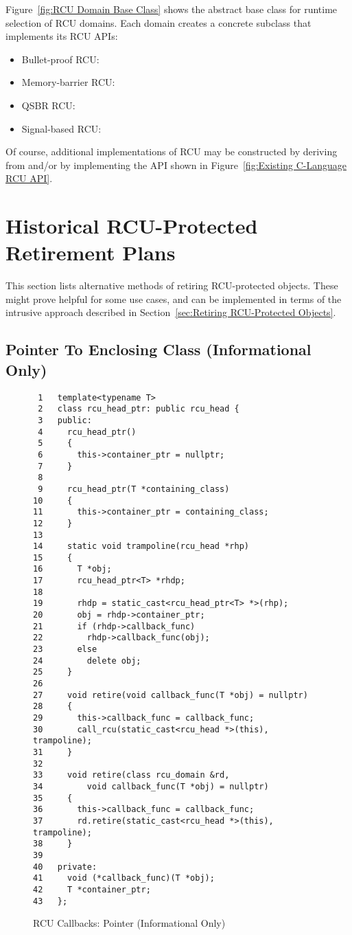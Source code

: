 \documentclass[letterpaper,10pt]{article}
\begin{document}
Figure~\ref{fig:RCU Domain Base Class}
shows the abstract base class for runtime selection of RCU domains.
Each domain creates a concrete subclass that implements its RCU APIs:

\begin{itemize}
\item	Bullet-proof RCU: 
\item	Memory-barrier RCU: 
\item	QSBR RCU: 
\item	Signal-based RCU: 
\end{itemize}

Of course, additional implementations of RCU may be constructed by
deriving from  and/or by implementing the API
shown in
Figure~\ref{fig:Existing C-Language RCU API}.

\section{Historical RCU-Protected Retirement Plans}
\label{fig:Historical RCU-Protected Retirement Plans}

This section lists alternative methods of retiring RCU-protected
objects.
These might prove helpful for some use cases, and can be implemented
in terms of the intrusive approach described in
Section~\ref{sec:Retiring RCU-Protected Objects}.

\subsection{Pointer To Enclosing Class (Informational Only)}
\label{sec:Pointer To Enclosing Class}

\begin{figure}[tbp]
{ \scriptsize
\begin{verbatim}
 1   template<typename T>
 2   class rcu_head_ptr: public rcu_head {
 3   public:
 4     rcu_head_ptr()
 5     {
 6       this->container_ptr = nullptr;
 7     }
 8
 9     rcu_head_ptr(T *containing_class)
10     {
11       this->container_ptr = containing_class;
12     }
13
14     static void trampoline(rcu_head *rhp)
15     {
16       T *obj;
17       rcu_head_ptr<T> *rhdp;
18
19       rhdp = static_cast<rcu_head_ptr<T> *>(rhp);
20       obj = rhdp->container_ptr;
21       if (rhdp->callback_func)
22         rhdp->callback_func(obj);
23       else
24         delete obj;
25     }
26
27     void retire(void callback_func(T *obj) = nullptr)
28     {
29       this->callback_func = callback_func;
30       call_rcu(static_cast<rcu_head *>(this), trampoline);
31     }
32
33     void retire(class rcu_domain &rd,
34         void callback_func(T *obj) = nullptr)
35     {
36       this->callback_func = callback_func;
37       rd.retire(static_cast<rcu_head *>(this), trampoline);
38     }
39
40   private:
41     void (*callback_func)(T *obj);
42     T *container_ptr;
43   };
\end{verbatim}
}
\caption{RCU Callbacks: Pointer (Informational Only)}
\label{fig:RCU Callbacks: Pointer}
\end{figure}
\end{document}
